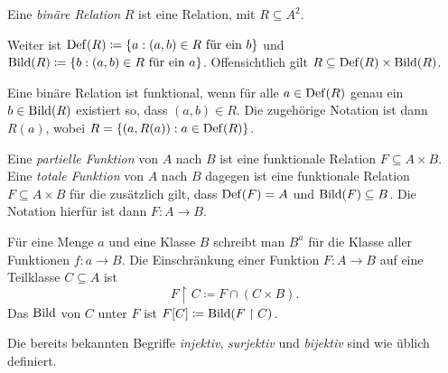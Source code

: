 \begin{definition}
	Eine \textit{binäre Relation} $R$ ist eine Relation, mit $R\subseteq A^2$.
\end{definition}

Weiter ist $\operatorname{Def}(R)\coloneqq\{a : (a,b)\in R \text{ für ein } b\}$ und $\operatorname{Bild}(R)\coloneqq \{b : (a,b)\in R \text{ für ein } a\}$. Offensichtlich gilt $R\subseteq \operatorname{Def}(R)\times \operatorname{Bild}(R)$.

\begin{definition}
Eine binäre Relation ist funktional, wenn für alle $a\in \operatorname{Def}(R)$ genau ein $b\in \operatorname{Bild}(R)$ existiert so, dass $(a,b)\in R$. Die zugehörige Notation ist dann $R(a)$, wobei $R=\{(a,R(a)) : a \in \operatorname{Def}(R)\}$.
\end{definition}

\begin{definition}
	Eine \textit{partielle Funktion} von $A$ nach $B$ ist eine funktionale Relation $F\subseteq A\times B$.
	\\
	Eine \textit{totale Funktion} von $A$ nach $B$ dagegen ist eine funktionale Relation $F\subseteq A\times B$ für die zusätzlich gilt, dass $\operatorname{Def}(F)=A$ und $\operatorname{Bild}(F)\subseteq B$. Die Notation hierfür ist dann $F:A \to B$.
\end{definition}

Für eine Menge $a$ und eine Klasse $B$ schreibt man $B^a$ für die Klasse aller Funktionen $f:a\to B$. Die Einschränkung einer Funktion $F: A\to B$ auf eine Teilklasse $C\subseteq A$ ist 
$$F\upharpoonright C\coloneqq F\cap(C\times B).$$ 
Das $\operatorname{Bild}$ von $C$ unter $F$ ist $F[C]\coloneqq \operatorname{Bild}(F\upharpoonright C)$.

Die bereits bekannten Begriffe \textit{injektiv}, \textit{surjektiv} und \textit{bijektiv} sind wie üblich definiert.

